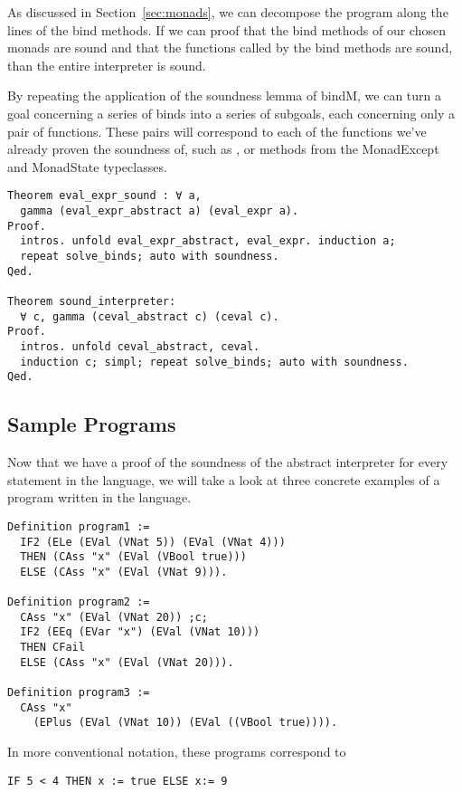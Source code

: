 As discussed in Section~\ref{sec:monads}, we can decompose the program along
the lines of the bind methods. If we can proof that the bind methods of our
chosen monads are sound and that the functions called by the bind methods are
sound, than the entire interpreter is sound. 

By repeating the application of the soundness lemma of bindM, 
we can turn a goal concerning a series of binds into a series of subgoals, each
concerning only a pair of functions. These pairs will correspond to each of the
functions we've already proven the soundness of, such as , or
methods from the MonadExcept and MonadState typeclasses.

\begin{verbatim}
Theorem eval_expr_sound : ∀ a,
  gamma (eval_expr_abstract a) (eval_expr a).
Proof.
  intros. unfold eval_expr_abstract, eval_expr. induction a; 
  repeat solve_binds; auto with soundness. 
Qed.

Theorem sound_interpreter:
  ∀ c, gamma (ceval_abstract c) (ceval c).
Proof.
  intros. unfold ceval_abstract, ceval. 
  induction c; simpl; repeat solve_binds; auto with soundness.
Qed.
\end{verbatim}

\subsection{Sample Programs}
Now that we have a proof of the soundness of the abstract interpreter for every
statement in the language, we will take a look at three concrete examples of a
program written in the language. 

\begin{verbatim}
Definition program1 := 
  IF2 (ELe (EVal (VNat 5)) (EVal (VNat 4))) 
  THEN (CAss "x" (EVal (VBool true))) 
  ELSE (CAss "x" (EVal (VNat 9))).

Definition program2 :=
  CAss "x" (EVal (VNat 20)) ;c;
  IF2 (EEq (EVar "x") (EVal (VNat 10)))
  THEN CFail
  ELSE (CAss "x" (EVal (VNat 20))).

Definition program3 :=
  CAss "x" 
  	(EPlus (EVal (VNat 10)) (EVal ((VBool true)))).
\end{verbatim}

In more conventional notation, these programs correspond to

\begin{lstlisting}
IF 5 < 4 THEN x := true ELSE x:= 9
\end{lstlisting}

